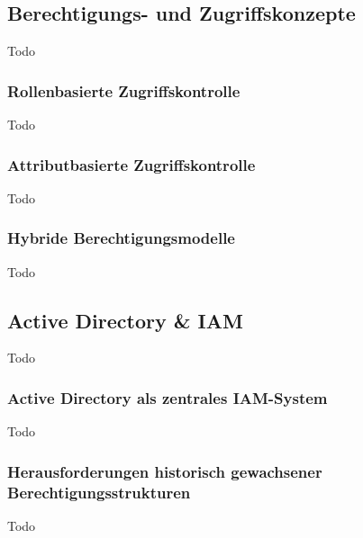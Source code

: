 \subsection{Berechtigungs- und Zugriffskonzepte}
Todo

\subsubsection{Rollenbasierte Zugriffskontrolle}
Todo

\subsubsection{Attributbasierte Zugriffskontrolle}
Todo

\subsubsection{Hybride Berechtigungsmodelle}
Todo

\subsection{Active Directory \& IAM}
Todo

\subsubsection{Active Directory als zentrales IAM-System}
Todo

\subsubsection{Herausforderungen historisch gewachsener Berechtigungsstrukturen}
Todo


